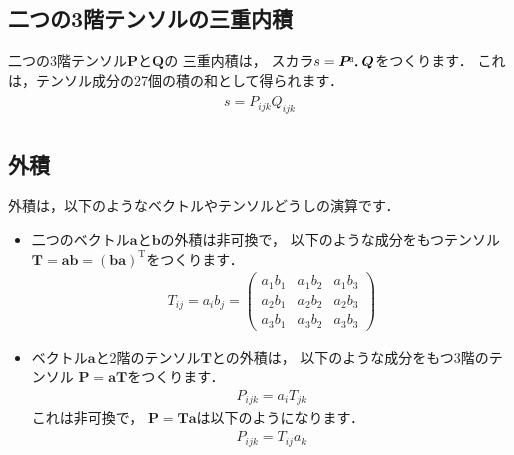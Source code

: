\subsection{二つの3階テンソルの三重内積}
\label{ssec:1.3.3}
二つの3階テンソル$\bm{P}$と$\bm{Q}$の
%
三重内積は，
スカラ$s = \bm{P} \triInProd \bm{Q}$をつくります．
これは，テンソル成分の27個の積の和として得られます．
\begin{align}
 \label{eq:1.18}
 \begin{aligned}
  s = P_{ijk}Q_{ijk}
 \end{aligned}
\end{align}


\subsection{外積}
\label{ssec:1.3.4}
%
外積は，以下のようなベクトルやテンソルどうしの演算です．
\begin{itemize}
 \item 二つのベクトル$\bm{a}$と$\bm{b}$の外積は非可換で，
       以下のような成分をもつテンソル
       $\bm{T} = \bm{a}\bm{b} = (\bm{b}\bm{a})^{\mathrm{T}}$をつくります．
       \begin{align}
        \label{eq:1.19}
        T_{ij} = a_{i}b_{j} =
        \begin{pmatrix}
         a_{1}b_{1} & a_{1}b_{2} & a_{1}b_{3} \\
         a_{2}b_{1} & a_{2}b_{2} & a_{2}b_{3} \\
         a_{3}b_{1} & a_{3}b_{2} & a_{3}b_{3}
        \end{pmatrix}
       \end{align}
 \item ベクトル$\bm{a}$と2階のテンソル$\bm{T}$との外積は，
       以下のような成分をもつ3階のテンソル
       $\bm{P} = \bm{a}\bm{T}$をつくります．
       \begin{align}
        \label{eq:1.20}
        P_{ijk} = a_{i}T_{jk}
       \end{align}
       これは非可換で，
       $\bm{P} = \bm{T}\bm{a}$は以下のようになります．
       \begin{align}
        \label{eq:1.21}
        P_{ijk} = T_{ij}a_{k}
       \end{align}
\end{itemize}


